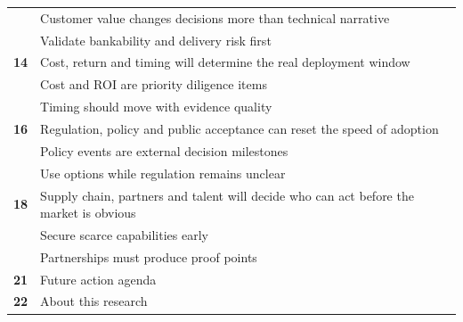 \documentclass[10pt,a4paper]{article}
\begin{document}
\begin{tabularx}{\linewidth}{p{14mm}Y}
 & {\scriptsize\color{BOMuted} Customer value changes decisions more than technical narrative} \\[1pt]
 & {\scriptsize\color{BOMuted} Validate bankability and delivery risk first} \\[1pt]
\textcolor{BOGreen}{\bfseries 14} & Cost, return and timing will determine the real deployment window \\[5pt]
 & {\scriptsize\color{BOMuted} Cost and ROI are priority diligence items} \\[1pt]
 & {\scriptsize\color{BOMuted} Timing should move with evidence quality} \\[1pt]
\textcolor{BOGreen}{\bfseries 16} & Regulation, policy and public acceptance can reset the speed of adoption \\[5pt]
 & {\scriptsize\color{BOMuted} Policy events are external decision milestones} \\[1pt]
 & {\scriptsize\color{BOMuted} Use options while regulation remains unclear} \\[1pt]
\textcolor{BOGreen}{\bfseries 18} & Supply chain, partners and talent will decide who can act before the market is obvious \\[5pt]
 & {\scriptsize\color{BOMuted} Secure scarce capabilities early} \\[1pt]
 & {\scriptsize\color{BOMuted} Partnerships must produce proof points} \\[1pt]
\textcolor{BOGreen}{\bfseries 21} & Future action agenda \\[5pt]
\textcolor{BOGreen}{\bfseries 22} & About this research \\[5pt]
\end{tabularx}
\clearpage
\end{document}
